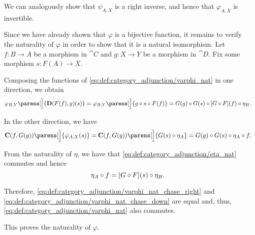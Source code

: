 \begin{defproof}
  We can analogously show that \( \psi_{A,X} \) is a right inverse, and hence that \( \varphi_{A,X} \) is invertible.

  Since we have already shown that \( \varphi \) is a bijective function, it remains to verify the naturality of \( \varphi \) in order to show that it is a natural isomorphism. Let \( f: B \to A \) be a morphism in \( \cat{C} \) and \( g: X \to Y \) be a morphism in \( \cat{D} \). Fix some morphism \( s: F(A) \to X \).

  Composing the functions of \eqref{eq:def:category_adjunction/varphi_nat} in one direction, we obtain
  \begin{equation}\label{eq:def:category_adjunction/varphi_nat_chase_right}
    \varphi_{B, Y}\parens[\Big]{ \cat{D}(F(f), g)(s) }
    =
    \varphi_{B, Y}\parens[\Big]{ g \bincirc s \bincirc F(f) }
    =
    G(g) \bincirc G(s) \bincirc [G \bincirc F](f) \bincirc \eta_B.
  \end{equation}

  In the other direction, we have
  \begin{equation}\label{eq:def:category_adjunction/varphi_nat_chase_down}
    \cat{C}(f, G(g))\parens[\Big]{ \varphi_{A, X}(s) }
    =
    \cat{C}(f, G(g))\parens[\Big]{ G(s) \bincirc \eta_A }
    =
    G(g) \bincirc G(s) \bincirc \eta_A \bincirc f.
  \end{equation}

  From the naturality of \( \eta \), we have that \eqref{eq:def:category_adjunction/eta_nat} commutes and hence
  \begin{equation*}
    \eta_A \bincirc f
    =
    [G \bincirc F](s) \bincirc \eta_B.
  \end{equation*}

  Therefore, \eqref{eq:def:category_adjunction/varphi_nat_chase_right} and \eqref{eq:def:category_adjunction/varphi_nat_chase_down} are equal and, thus, \eqref{eq:def:category_adjunction/varphi_nat} also commutes.

  This proves the naturality of \( \varphi \).
\end{defproof}

